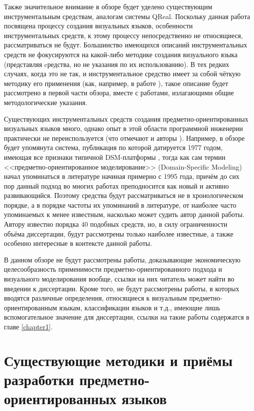 Также значительное внимание в обзоре будет уделено существующим инструментальным средствам, 
аналогам системы QReal. Поскольку данная работа посвящена процессу создания визуальных 
языков, особенности инструментальных средств, к этому процессу непосредственно не 
относящиеся, рассматриваться не будут. Большинство имеющихся описаний инструментальных средств 
не фокусируются на какой-либо методике создания визуального языка (представляя 
cредства, но не указания по их использованию). В тех редких случаях, когда это не так, 
и инструментальное средство имеет за собой чёткую методику его применения (как, 
например, в работе \cite{repenning1995agentsheets}), такое описание будет рассмотрено в 
первой части обзора, вместе с работами, излагающими общие методологические указания.

Существующих инструментальных средств создания предметно-ориентированных визуальных 
языков много, однако опыт в этой области программной инженерии практически не переиспользуется 
(что отмечают и авторы \cite{kelly2008domain}). Например, в обзоре будет упомянута 
система, публикация по которой датируется 1977 годом, имеющая все признаки типичной 
\ac{DSM}-платформы \cite{teichroew1977psl}, тогда как сам термин <<предметно-ориентированное 
моделирование>> (Domain-Specific Modeling) начал упоминаться в литературе начиная примерно с 
1995 года, причём до сих пор данный подход во многих работах преподносится как новый и активно 
развивающийся. Поэтому средства будут рассматриваться не в хронологическом 
порядке, а в порядке частоты их упоминаний в литературе, от наиболее часто упоминаемых к менее 
известным, насколько может судить автор данной работы. Автору известно порядка 40 подобных
средств, но, в силу ограниченности объёма диссертации, будут рассмотрены только наиболее 
известные, а также особенно интересные в контексте данной работы.

В данном обзоре не будут рассмотрены работы, доказывающие экономическую целесообразность
применимости предметно-ориентированного подхода и визуального моделирования вообще,
ссылки на них читатель может найти во введении к диссертации. Кроме того, не будут
рассмотрены работы, в которых вводятся различные определения, относящиеся к визуальным
предметно-ориентированным языкам, классификации языков и т.д., имеющие лишь вспомогательное
значение для диссертации, ссылки на такие работы содержатся в главе \ref{chapter1}.

\section{Существующие методики и приёмы разработки предметно-ориентированных языков}
